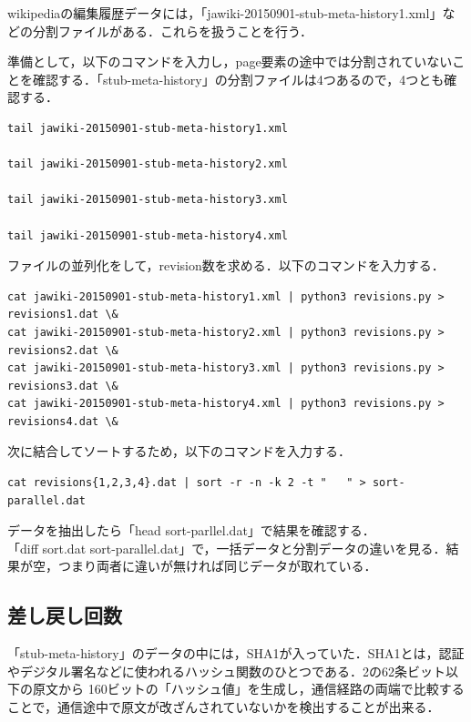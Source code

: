 wikipediaの編集履歴データには，「jawiki-20150901-stub-meta-history1.xml」などの分割ファイルがある．これらを扱うことを行う．

準備として，以下のコマンドを入力し，page要素の途中では分割されていないことを確認する．「stub-meta-history」の分割ファイルは4つあるので，4つとも確認する．

{\small
\begin{verbatim}
tail jawiki-20150901-stub-meta-history1.xml

tail jawiki-20150901-stub-meta-history2.xml

tail jawiki-20150901-stub-meta-history3.xml

tail jawiki-20150901-stub-meta-history4.xml
\end{verbatim}}



ファイルの並列化をして，revision数を求める．以下のコマンドを入力する．

{\small
\begin{verbatim}
cat jawiki-20150901-stub-meta-history1.xml | python3 revisions.py > revisions1.dat \&
cat jawiki-20150901-stub-meta-history2.xml | python3 revisions.py > revisions2.dat \&
cat jawiki-20150901-stub-meta-history3.xml | python3 revisions.py > revisions3.dat \&
cat jawiki-20150901-stub-meta-history4.xml | python3 revisions.py > revisions4.dat \&
\end{verbatim}}

次に結合してソートするため，以下のコマンドを入力する．

{\small
\begin{verbatim}
cat revisions{1,2,3,4}.dat | sort -r -n -k 2 -t "   " > sort-parallel.dat
\end{verbatim}}

データを抽出したら「head sort-parllel.dat」で結果を確認する． \\
「diff sort.dat sort-parallel.dat」で，一括データと分割データの違いを見る．結果が空，つまり両者に違いが無ければ同じデータが取れている．

\clearpage


\subsection{差し戻し回数}

「stub-meta-history」のデータの中には，SHA1が入っていた．SHA1とは，認証やデジタル署名などに使われるハッシュ関数のひとつである．2の62条ビット以下の原文から
160ビットの「ハッシュ値」を生成し，通信経路の両端で比較することで，通信途中で原文が改ざんされていないかを検出することが出来る．

